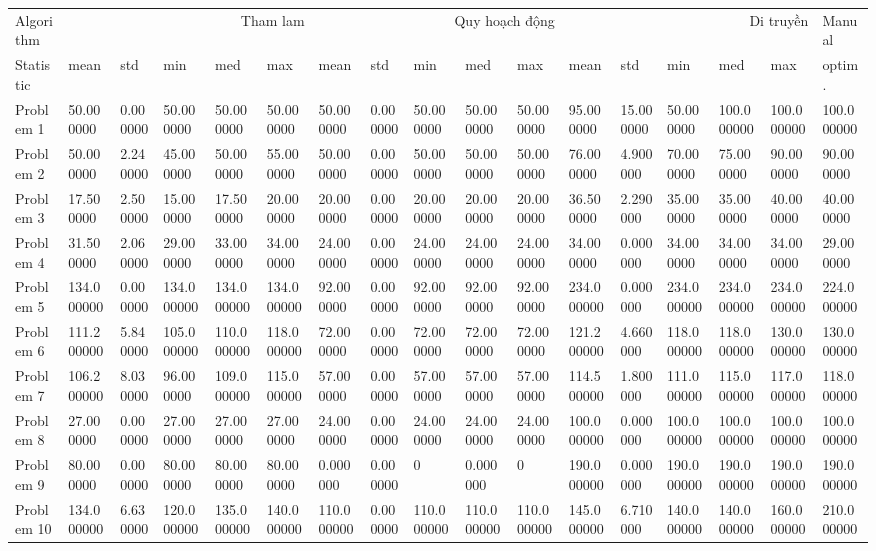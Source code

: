 \begin{tabular}{lllllllllllllllll}
\toprule
Algorithm & \multicolumn{5}{r}{Tham lam} & \multicolumn{5}{r}{Quy hoạch động} & \multicolumn{5}{r}{Di truyền} & Manual \\
Statistic & mean & std & min & med & max & mean & std & min & med & max & mean & std & min & med & max & optim. \\
\midrule
Problem 1 & 50.000000 & 0.000000 & 50.000000 & 50.000000 & 50.000000 & 50.000000 & 0.000000 & 50.000000 & 50.000000 & 50.000000 & 95.000000 & 15.000000 & 50.000000 & 100.000000 & 100.000000 & 100.000000 \\
Problem 2 & 50.000000 & 2.240000 & 45.000000 & 50.000000 & 55.000000 & 50.000000 & 0.000000 & 50.000000 & 50.000000 & 50.000000 & 76.000000 & 4.900000 & 70.000000 & 75.000000 & 90.000000 & 90.000000 \\
Problem 3 & 17.500000 & 2.500000 & 15.000000 & 17.500000 & 20.000000 & 20.000000 & 0.000000 & 20.000000 & 20.000000 & 20.000000 & 36.500000 & 2.290000 & 35.000000 & 35.000000 & 40.000000 & 40.000000 \\
Problem 4 & 31.500000 & 2.060000 & 29.000000 & 33.000000 & 34.000000 & 24.000000 & 0.000000 & 24.000000 & 24.000000 & 24.000000 & 34.000000 & 0.000000 & 34.000000 & 34.000000 & 34.000000 & 29.000000 \\
Problem 5 & 134.000000 & 0.000000 & 134.000000 & 134.000000 & 134.000000 & 92.000000 & 0.000000 & 92.000000 & 92.000000 & 92.000000 & 234.000000 & 0.000000 & 234.000000 & 234.000000 & 234.000000 & 224.000000 \\
Problem 6 & 111.200000 & 5.840000 & 105.000000 & 110.000000 & 118.000000 & 72.000000 & 0.000000 & 72.000000 & 72.000000 & 72.000000 & 121.200000 & 4.660000 & 118.000000 & 118.000000 & 130.000000 & 130.000000 \\
Problem 7 & 106.200000 & 8.030000 & 96.000000 & 109.000000 & 115.000000 & 57.000000 & 0.000000 & 57.000000 & 57.000000 & 57.000000 & 114.500000 & 1.800000 & 111.000000 & 115.000000 & 117.000000 & 118.000000 \\
Problem 8 & 27.000000 & 0.000000 & 27.000000 & 27.000000 & 27.000000 & 24.000000 & 0.000000 & 24.000000 & 24.000000 & 24.000000 & 100.000000 & 0.000000 & 100.000000 & 100.000000 & 100.000000 & 100.000000 \\
Problem 9 & 80.000000 & 0.000000 & 80.000000 & 80.000000 & 80.000000 & 0.000000 & 0.000000 & 0 & 0.000000 & 0 & 190.000000 & 0.000000 & 190.000000 & 190.000000 & 190.000000 & 190.000000 \\
Problem 10 & 134.000000 & 6.630000 & 120.000000 & 135.000000 & 140.000000 & 110.000000 & 0.000000 & 110.000000 & 110.000000 & 110.000000 & 145.000000 & 6.710000 & 140.000000 & 140.000000 & 160.000000 & 210.000000 \\
\bottomrule
\end{tabular}
